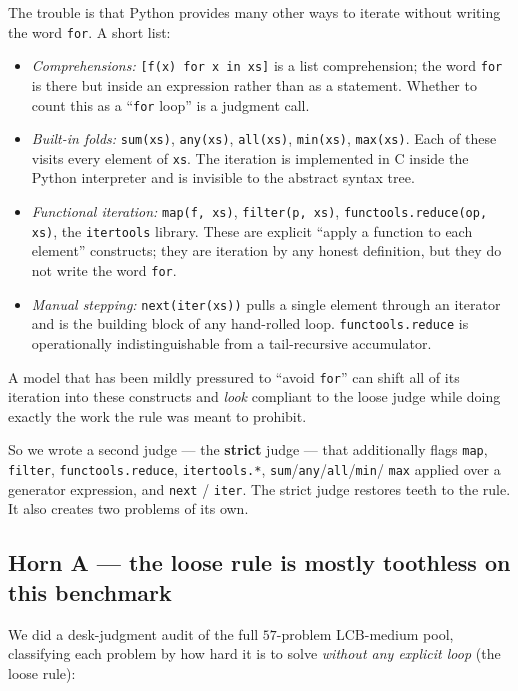 \documentclass[11pt]{article}
\begin{document}
The trouble is that Python provides many other ways to iterate without
writing the word \texttt{for}. A short list:

\begin{itemize}
\item \emph{Comprehensions:} \texttt{[f(x) for x in xs]} is a list
      comprehension; the word \texttt{for} is there but inside an
      expression rather than as a statement. Whether to count this as
      a ``\texttt{for} loop'' is a judgment call.
\item \emph{Built-in folds:} \texttt{sum(xs)}, \texttt{any(xs)},
      \texttt{all(xs)}, \texttt{min(xs)}, \texttt{max(xs)}. Each of
      these visits every element of \texttt{xs}. The iteration is
      implemented in C inside the Python interpreter and is invisible
      to the abstract syntax tree.
\item \emph{Functional iteration:} \texttt{map(f, xs)},
      \texttt{filter(p, xs)}, \texttt{functools.reduce(op, xs)}, the
      \texttt{itertools} library. These are explicit ``apply a
      function to each element'' constructs; they are iteration by any
      honest definition, but they do not write the word \texttt{for}.
\item \emph{Manual stepping:} \texttt{next(iter(xs))} pulls a single
      element through an iterator and is the building block of any
      hand-rolled loop. \texttt{functools.reduce} is operationally
      indistinguishable from a tail-recursive accumulator.
\end{itemize}

A model that has been mildly pressured to ``avoid \texttt{for}'' can shift
all of its iteration into these constructs and \emph{look} compliant to
the loose judge while doing exactly the work the rule was meant to
prohibit.

So we wrote a second judge --- the \textbf{strict} judge --- that
additionally flags \texttt{map}, \texttt{filter}, \texttt{functools.reduce},
\texttt{itertools.*}, \texttt{sum}/\texttt{any}/\texttt{all}/\texttt{min}/
\texttt{max} applied over a generator expression, and \texttt{next} /
\texttt{iter}. The strict judge restores teeth to the rule. It also
creates two problems of its own.

\subsection*{Horn A --- the loose rule is mostly toothless on this benchmark}

We did a desk-judgment audit of the full $57$-problem LCB-medium pool,
classifying each problem by how hard it is to solve \emph{without any
explicit loop} (the loose rule):
\end{document}
